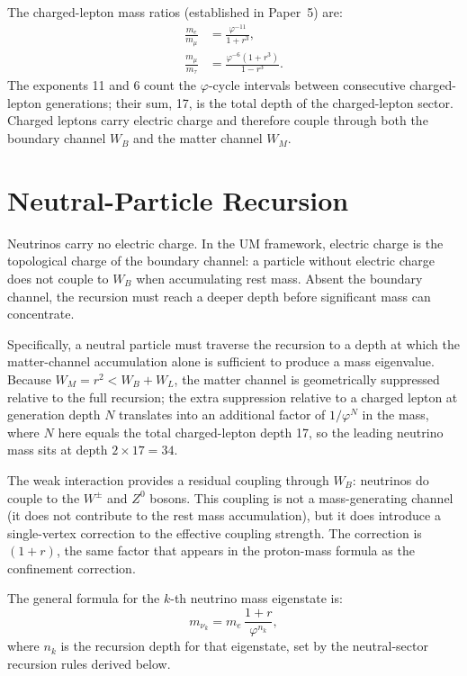 \documentclass[12pt]{article}
\begin{document}
The charged-lepton mass ratios (established in Paper~5) are:
\begin{align}
  \frac{m_e}{m_\mu} &= \frac{\varphi^{-11}}{1+r^3},
  \label{eq:memu}\\[4pt]
  \frac{m_\mu}{m_\tau} &= \frac{\varphi^{-6}(1+r^3)}{1-r^3}.
  \label{eq:mmtau}
\end{align}
The exponents 11 and 6 count the $\varphi$-cycle intervals between
consecutive charged-lepton generations; their sum, 17, is the total
depth of the charged-lepton sector.  Charged leptons carry electric
charge and therefore couple through both the boundary channel $W_B$
and the matter channel $W_M$.

\section{Neutral-Particle Recursion}

Neutrinos carry no electric charge.  In the UM framework, electric
charge is the topological charge of the boundary channel: a particle
without electric charge does not couple to $W_B$ when accumulating
rest mass.  Absent the boundary channel, the recursion must reach a
deeper depth before significant mass can concentrate.

Specifically, a neutral particle must traverse the recursion to a
depth at which the matter-channel accumulation alone is sufficient
to produce a mass eigenvalue.  Because $W_M = r^2 < W_B + W_L$,
the matter channel is geometrically suppressed relative to the full
recursion; the extra suppression relative to a charged lepton at
generation depth $N$ translates into an additional factor of
$1/\varphi^N$ in the mass, where $N$ here equals the total
charged-lepton depth 17, so the leading neutrino mass sits at depth
$2 \times 17 = 34$.

The weak interaction provides a residual coupling through $W_B$:
neutrinos do couple to the $W^\pm$ and $Z^0$ bosons.  This coupling
is not a mass-generating channel (it does not contribute to the rest
mass accumulation), but it does introduce a single-vertex correction
to the effective coupling strength.  The correction is $(1+r)$, the
same factor that appears in the proton-mass formula as the confinement
correction.

The general formula for the $k$-th neutrino mass eigenstate is:
\begin{equation}
  m_{\nu_k} = m_e \,\frac{1+r}{\varphi^{n_k}},
  \label{eq:mnuk}
\end{equation}
where $n_k$ is the recursion depth for that eigenstate, set by the
neutral-sector recursion rules derived below.
\end{document}
